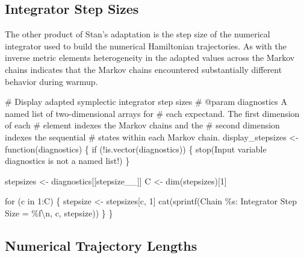 \documentclass[
  letterpaper,
  DIV=11,
  numbers=noendperiod]{scrartcl}
\newenvironment{Shaded}{\begin{snugshade}}{\end{snugshade}}
\newcommand{\CharTok}[1]{\textcolor[rgb]{0.13,0.47,0.30}{#1}}
\newcommand{\CommentTok}[1]{\textcolor[rgb]{0.37,0.37,0.37}{#1}}
\newcommand{\ControlFlowTok}[1]{\textcolor[rgb]{0.00,0.23,0.31}{#1}}
\newcommand{\DecValTok}[1]{\textcolor[rgb]{0.68,0.00,0.00}{#1}}
\newcommand{\KeywordTok}[1]{\textcolor[rgb]{0.00,0.23,0.31}{#1}}
\newcommand{\NormalTok}[1]{\textcolor[rgb]{0.00,0.23,0.31}{#1}}
\newcommand{\OperatorTok}[1]{\textcolor[rgb]{0.37,0.37,0.37}{#1}}
\newcommand{\SpecialCharTok}[1]{\textcolor[rgb]{0.37,0.37,0.37}{#1}}
\newcommand{\StringTok}[1]{\textcolor[rgb]{0.13,0.47,0.30}{#1}}
\begin{document}
\subsection{Integrator Step Sizes}\label{integrator-step-sizes}

The other product of Stan's adaptation is the step size of the numerical
integrator used to build the numerical Hamiltonian trajectories. As with
the inverse metric elements heterogeneity in the adapted values across
the Markov chains indicates that the Markov chains encountered
substantially different behavior during warmup.

\begin{Shaded}
\begin{Highlighting}[]
\CommentTok{\# Display adapted symplectic integrator step sizes}
\CommentTok{\# @param diagnostics A named list of two{-}dimensional arrays for }
\CommentTok{\#                    each expectand.  The first dimension of each}
\CommentTok{\#                    element indexes the Markov chains and the }
\CommentTok{\#                    second dimension indexes the sequential }
\CommentTok{\#                    states within each Markov chain.}
\NormalTok{display\_stepsizes }\OperatorTok{\textless{}{-}}\NormalTok{ function(diagnostics) \{}
  \ControlFlowTok{if}\NormalTok{ (}\OperatorTok{!}\KeywordTok{is}\NormalTok{.vector(diagnostics)) \{}
\NormalTok{    stop(}\StringTok{\textquotesingle{}Input variable \textasciigrave{}diagnostics\textasciigrave{} is not a named list!\textquotesingle{}}\NormalTok{)}
\NormalTok{  \}}
  
\NormalTok{  stepsizes }\OperatorTok{\textless{}{-}}\NormalTok{ diagnostics[[}\StringTok{\textquotesingle{}stepsize\_\_\textquotesingle{}}\NormalTok{]]}
\NormalTok{  C }\OperatorTok{\textless{}{-}}\NormalTok{ dim(stepsizes)[}\DecValTok{1}\NormalTok{]}
  
  \ControlFlowTok{for}\NormalTok{ (c }\KeywordTok{in} \DecValTok{1}\NormalTok{:C) \{}
\NormalTok{    stepsize }\OperatorTok{\textless{}{-}}\NormalTok{ stepsizes[c, }\DecValTok{1}\NormalTok{]}
\NormalTok{    cat(sprintf(}\StringTok{\textquotesingle{}Chain }\SpecialCharTok{\%s}\StringTok{: Integrator Step Size = }\SpecialCharTok{\%f}\CharTok{\textbackslash{}n}\StringTok{\textquotesingle{}}\NormalTok{,}
\NormalTok{                c, stepsize))}
\NormalTok{  \}}
\NormalTok{\}}
\end{Highlighting}
\end{Shaded}

\subsection{Numerical Trajectory
Lengths}\label{numerical-trajectory-lengths}
\end{document}
